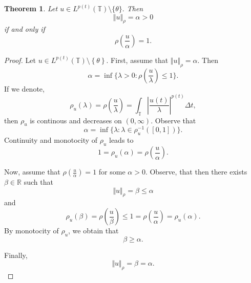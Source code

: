 \documentclass[12pt,a4paper,oneside,titlepage]{article}
\newtheorem{Twierdzenie}{Theorem}
\begin{document}
\begin{Twierdzenie}
\label{rho_1}
 Let $u \in L^{p(t)}(\mathbb{T})\setminus \lbrace \theta \rbrace.$ Then
 \begin{equation}
 \nonumber
 \Vert u \Vert_{\rho} = \alpha>0
 \end{equation}
if and only if 
\begin{equation}
\rho\left(\frac{u}{\alpha}\right)=1.
\end{equation}
\end{Twierdzenie}
\begin{proof} 
Let $u \in L^{p(t)}(\mathbb{T})\setminus \left\lbrace \theta \right\rbrace $. First, assume that $\Vert u \Vert_{\rho} =\alpha$. Then
\begin{equation}
\nonumber
\alpha = \inf \lbrace \lambda > 0 : \rho \left( \frac{u}{\lambda} \right) \leq 1 \rbrace .
\end{equation}
If we denote,
\begin{equation}
\nonumber
 \rho_u(\lambda) =\rho \left( \frac{u}{\lambda} \right) = \int_{\mathbb{T}} \left\vert \frac{u(t)}{\lambda} \right\vert^{p(t)}  \Delta t, 
\end{equation}
then $\rho_u$ is continous and decreases on $(0, \infty)$. Observe that 
\begin{equation}
\nonumber 
\alpha = \inf \lbrace \lambda : \lambda \in \rho^{-1}_u \left( [0, 1 ] \right) \rbrace.
\end{equation}
Continuity and monotocity of $\rho_u$ leads to
\begin{equation}
\nonumber
1=\rho_u(\alpha) = \rho\left(\frac{u}{\alpha}\right).
\end{equation}

Now, assume that $\rho(\frac{u}{\alpha})=1$  for some $\alpha>0$. Observe, that then there exists $\beta \in \mathbb{R}$ such that
\begin{equation}
\nonumber
\Vert u \Vert_{\rho} = \beta \leq \alpha  
\end{equation}
and
\begin{equation}
\nonumber
\rho_{u}(\beta) = \rho \left( \frac{u}{\beta} \right) \leq 1 = \rho \left( \frac{u}{\alpha} \right) = \rho_{u}(\alpha). 
\end{equation}
By monotocity of $\rho_{u}$, we obtain that 
\begin{equation}
\nonumber
 \beta \geq \alpha.
\end{equation}

Finally,
\begin{equation}
\nonumber
\Vert u \Vert_{\rho} = \beta = \alpha. 
\end{equation}
\end{proof}
\end{document}
